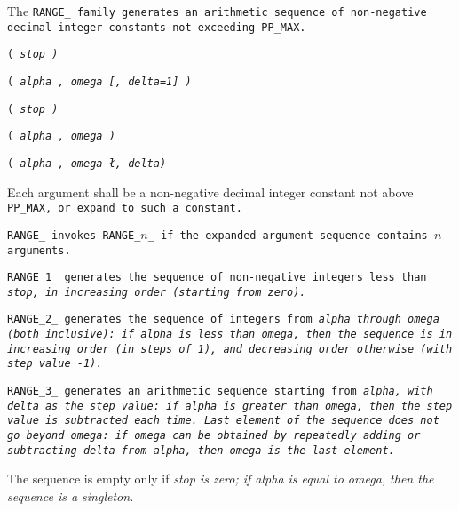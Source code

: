 The \tt{RANGE_} family generates an arithmetic sequence of
non-negative decimal integer constants not exceeding \tt{PP_MAX}.


\s\s\s\tt{(} \it{stop} \tt{)}

\s\s\s\tt{(} \it{alpha} \tt{,} \it{omega} [\tt{,} \it{delta}\tt{=1}] \tt{)}

\s\tt{(} \it{stop} \tt{)}

\s\tt{(} \it{alpha} \tt{,} \it{omega} \tt{)}

\s\tt{(} \it{alpha} \tt{,} \it{omega} \l\tt{,} \it{delta}\r \tt{)}


Each argument shall be a non-negative decimal integer
constant not above \tt{PP_MAX}, or expand to such a constant.


\tt{RANGE_} invokes \tt{RANGE_}$n$\_ if the
expanded argument sequence contains $n$ arguments.

\tt{RANGE_1_} generates the sequence of non-negative integers
less than \it{stop}, in increasing order (starting from zero).

\tt{RANGE_2_} generates the sequence of integers from \it{alpha} through
\it{omega} (both inclusive): if \it{alpha} is less than \it{omega},
then the sequence is in increasing order (in steps of 1),
and decreasing order otherwise (with step value -1).

\tt{RANGE_3_} generates an arithmetic sequence starting from \it{alpha},
with \it{delta} as the step value: if \it{alpha} is greater
than \it{omega}, then the step value is subtracted each time.
Last element of the sequence does not go beyond \it{omega}:
if \it{omega} can be obtained by repeatedly adding or subtracting
\it{delta} from \it{alpha}, then \it{omega} is the last element.

\note The sequence is empty only if \it{stop} is zero;
if \it{alpha} is equal to \it{omega}, then the sequence is a singleton.
